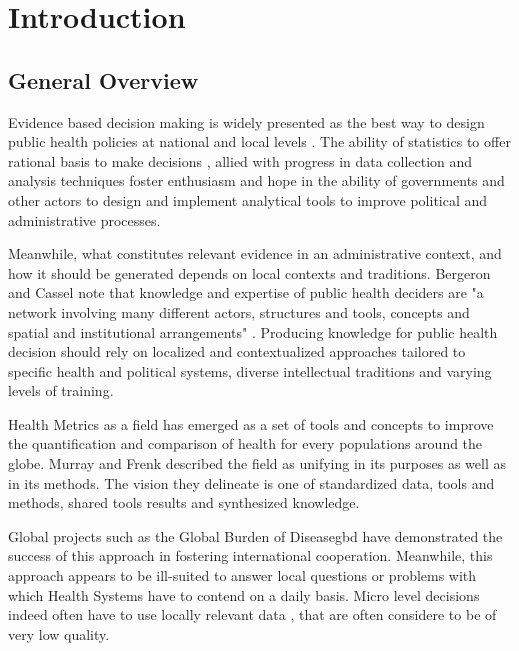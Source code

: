 \section{Introduction}

\subsection{General Overview}

Evidence based decision making is widely presented as the best way to design public health policies at national and local levels \citep{abou-zahr_health_2005,shibuya_health_2005,bambas_nolen_strengthening_2005,mutemwa_hmis_2006,boerma_public_2013}.
The ability of statistics to offer rational basis to make decisions \citep{desrosieres_politique_1993,porter_trust_1996},
allied with progress in data collection and analysis techniques foster enthusiasm and hope in the ability of governments and other actors to design and implement analytical tools to improve political and administrative processes.

Meanwhile, what constitutes relevant evidence in an administrative context, and how it should be generated depends on local contexts and traditions. Bergeron and Cassel note that knowledge and expertise of public health deciders are "a network involving many different actors, structures and tools, concepts and spatial and institutional arrangements" \citep{bergeron_savoirs_2014}. Producing knowledge for public health decision should rely on localized and contextualized approaches tailored to specific health and political systems, diverse intellectual traditions and varying levels of training.

Health Metrics as a field has emerged as a set of tools and concepts to improve the quantification and comparison of health for every populations around the globe.
Murray and Frenk described the field as unifying in its purposes as well as in its methods\citep{murray_health_2008}. The vision they delineate is one of standardized data, tools and methods, shared tools results and synthesized knowledge.

Global projects such as the Global Burden of Disease\gls{gbd} have demonstrated the success of this approach in fostering international cooperation. Meanwhile, this approach appears to be  ill-suited to answer local questions or problems with which Health Systems have to contend on a daily basis. Micro level decisions indeed often have to use locally relevant data %
, that are often considere to be of very low quality.

